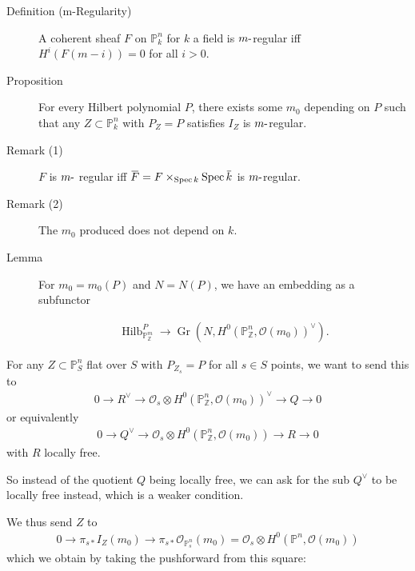 \begin{description}
\item[Definition (m-Regularity)]
A coherent sheaf \(F\) on \({\mathbb{P}}_k^n\) for \(k\) a field is
\(m{\hbox{-}}\)regular iff \(H^i(F(m-i)) = 0\) for all \(i> 0\).
\item[Proposition]
For every Hilbert polynomial \(P\), there exists some \(m_0\) depending
on \(P\) such that any \(Z \subset {\mathbb{P}}^n_k\) with \(P_Z = P\)
satisfies \(I_Z\) is \(m{\hbox{-}}\)regular.
\item[Remark (1)]
\(F\) is \(m{\hbox{-}}\) regular iff
\(\mkern 1.5mu\overline{\mkern-1.5muF\mkern-1.5mu}\mkern 1.5mu = F \times_{\operatorname{Spec}k} \operatorname{Spec}\mkern 1.5mu\overline{\mkern-1.5muk\mkern-1.5mu}\mkern 1.5mu\)
is \(m{\hbox{-}}\)regular.
\item[Remark (2)]
The \(m_0\) produced does not depend on \(k\).
\item[Lemma]
For \(m_0 = m_0(P)\) and \(N = N(P)\), we have an embedding as a
subfunctor

\begin{align*} \operatorname{Hilb}_{{\mathbb{P}}^m_{\mathbb{Z}}}^P \to {\operatorname{Gr}}(N, H^0( {\mathbb{P}}^n_{\mathbb{Z}}, {\mathcal{O}}(m_0)  )^\vee) .\end{align*}
\end{description}

For any \(Z \subset {\mathbb{P}}^n_S\) flat over \(S\) with
\(P_{Z_s} = P\) for all \(s\in S\) points, we want to send this to
\begin{align*}
0\to R^\vee\to {\mathcal{O}}_s \otimes H^0({\mathbb{P}}^n_{\mathbb{Z}}, {\mathcal{O}}(m_0))^\vee\to Q \to 0
\end{align*}
or equivalently
\begin{align*}
0 \to Q^\vee\to {\mathcal{O}}_s \otimes H^0({\mathbb{P}}^n_{\mathbb{Z}}, {\mathcal{O}}(m_0)) \to R \to 0
\end{align*}
with \(R\) locally free.

So instead of the quotient \(Q\) being locally free, we can ask for the
sub \(Q^\vee\) to be locally free instead, which is a weaker condition.

We thus send \(Z\) to
\begin{align*}
0 \to \pi_{s*} I_Z(m_0) \to \pi_{s*} {\mathcal{O}}_{{\mathbb{P}}^n_s}(m_0) = {\mathcal{O}}_s \otimes H^0({\mathbb{P}}^n, {\mathcal{O}}(m_0))
\end{align*}
which we obtain by taking the pushforward from this square:

